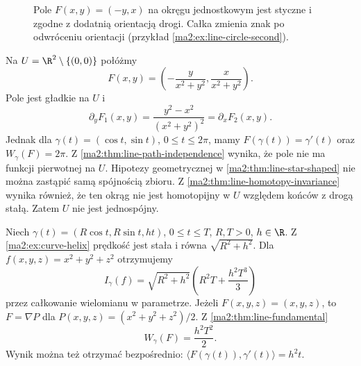 \begin{figure}[htbp]
\centering
{}
\caption{Pole $F(x,y)=(-y,x)$ na okręgu jednostkowym
jest styczne i zgodne z dodatnią orientacją drogi.
Całka zmienia znak po odwróceniu orientacji
(przykład \ref{ma2:ex:line-circle-second}).}
\label{ma2:fig:line-circle}
\end{figure}

\begin{przyklad}
\label{ma2:ex:line-punctured-plane}
Na $U=\R^2\setminus\{(0,0)\}$ połóżmy
\[
 F(x,y)=\left(-\frac{y}{x^2+y^2},
 \frac{x}{x^2+y^2}\right).
\]
Pole jest gładkie na $U$ i
\[
 \partial_yF_1(x,y)=
 \frac{y^2-x^2}{(x^2+y^2)^2}
 =\partial_xF_2(x,y).
\]
Jednak dla $\gamma(t)=(\cos t,\sin t)$,
$0\le t\le2\pi$, mamy $F(\gamma(t))=\gamma'(t)$
oraz $W_\gamma(F)=2\pi$.
Z \ref{ma2:thm:line-path-independence}
wynika, że pole nie ma funkcji pierwotnej na $U$.
Hipotezy geometrycznej w
\ref{ma2:thm:line-star-shaped} nie można
zastąpić samą spójnością zbioru.
Z \ref{ma2:thm:line-homotopy-invariance} wynika
również, że ten okrąg nie jest homotopijny
w $U$ względem końców z drogą stałą.
Zatem $U$ nie jest jednospójny.
\end{przyklad}

\begin{przyklad}
\label{ma2:ex:line-helix}
Niech $\gamma(t)=(R\cos t,R\sin t,ht)$,
$0\le t\le T$, $R,T>0$, $h\in\R$.
Z \ref{ma2:ex:curve-helix} prędkość jest
stała i równa $\sqrt{R^2+h^2}$.
Dla $f(x,y,z)=x^2+y^2+z^2$ otrzymujemy
\[
 I_\gamma(f)=\sqrt{R^2+h^2}
 \left(R^2T+\frac{h^2T^3}{3}\right)
\]
przez całkowanie wielomianu w parametrze.
Jeżeli $F(x,y,z)=(x,y,z)$, to
$F=\nabla P$ dla $P(x,y,z)=(x^2+y^2+z^2)/2$.
Z \ref{ma2:thm:line-fundamental}
\[
 W_\gamma(F)=\frac{h^2T^2}{2}.
\]
Wynik można też otrzymać bezpośrednio:
$\langle F(\gamma(t)),\gamma'(t)\rangle=h^2t$.
\end{przyklad}

